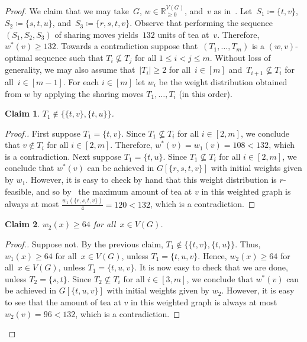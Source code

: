 \documentclass[reqno, 12pt]{amsart}
\numberwithin{equation}{section}
\numberwithin{figure}{section}
\theoremstyle{plain}
\newtheorem{clm}{Claim}[]
\theoremstyle{definition}
\newenvironment{subproof}[1][Proof.]{%
    \begin{proof}[{#1}]%
        \renewcommand*{\qedsymbol}{\scalebox{1.2}{$\square$}}}{%
    \end{proof}}
\newcommand*{\abs}[1]{\ensuremath{{\left\lvert {#1} \right\rvert}}}
\newcommand*{\weights}{\ensuremath{\mathbb{R}_{\geq 0}^{V(G)}}}
\begin{document}
\begin{proof}
    We claim that we may take~$G$, ${w \in \weights}$, and~$v$ as in~. 
    Let~${S_1 \coloneqq \{t,v\}}$, ${S_2 \coloneqq \{s,t,u\}}$, and~${S_3 \coloneqq \{r,s,t,v\}}$. 
    Observe that performing the sequence~${(S_1, S_2, S_3)}$ of sharing moves yields~$132$ units of tea at~$v$. Therefore, $w^*(v) \geq 132$. Towards a contradiction suppose that~${(T_1, \dots, T_m)}$ is a ${(w, v)}$-optimal sequence such that $T_i \not\subseteq T_j$ for all $1 \leq i < j \leq m$. Without loss of generality, we may also assume that~${\abs{T_i} \geq 2}$ for all~${i \in [m]}$ and~${T_{i+1} \not\subseteq T_{i}}$ for all~${i \in [m-1]}$.  For each $i \in [m]$ let $w_i$ be the weight distribution obtained from $w$ by applying the sharing moves $T_1, \dots, T_i$ (in this order).

    \begin{clm} 
        $T_1 \notin \{\{t,v\},\{t,u\}\}$.    
    \end{clm}

    \begin{subproof} 
      First suppose $T_1=\{t,v\}$.
      Since $T_1 \not\subseteq T_i$ for all $i \in [2, m]$, we conclude that $v \notin T_i$ for all $i \in [2,m]$.  Therefore, $w^*(v)=w_1(v)=108<132$, which is a contradiction.  Next suppose $T_1=\{t,u\}$.  Since $T_1 \not\subseteq T_i$ for all $i \in [2, m]$, we conclude that $w^*(v)$ can be achieved in $G[\{r,s,t,v\}]$ with initial weights given by $w_1$.  However, it is easy to check by hand that this weight distribution is $r$-feasible, and so by~ the maximum amount of tea at $v$ in this weighted graph is always at most $\frac{w_1(\{r,s,t,v\})}{4}=120<132$, which is a contradiction.
    \end{subproof}


        \begin{clm}
        ${w_2(x) \geq 64}$ for all~${x \in V(G)}$.
        \end{clm}

        \begin{subproof}
        Suppose not.
        By the previous claim, $T_1 \notin \{\{t,v\},\{t,u\}\}$.  Thus, ${w_1(x) \geq 64}$ for all~${x \in V(G)}$, unless $T_1=\{t,u,v\}$. Hence, ${w_2(x) \geq 64}$ for all~${x \in V(G)}$, unless $T_1=\{t,u,v\}$.  It is now easy to check that we are done, unless $T_2=\{s,t\}$.  Since $T_2 \not\subseteq T_i$ for all $i \in [3,m]$, we conclude that $w^*(v)$ can be achieved in $G[\{t,u,v\}]$ with initial weights given by $w_2$. However, it is easy to see that the amount of tea at $v$ in this weighted graph is always at most $w_2(v)=96<132$, which is a contradiction.      
        \end{subproof}
        

\end{proof}
\end{document}
